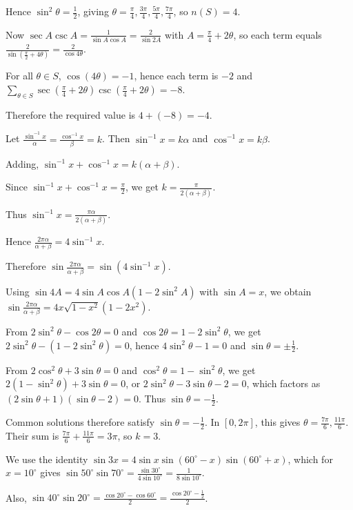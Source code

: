   Hence $\sin^2\theta=\tfrac12$, giving $\theta=\tfrac\pi4,\tfrac{3\pi}4,\tfrac{5\pi}4,\tfrac{7\pi}4$, so
  $n(S)=4$.

  Now $\sec A\csc A=\frac1{\sin A\cos A}=\frac{2}{\sin 2A}$ with $A=\tfrac\pi4+2\theta$, so each term equals
  $\frac{2}{\sin(\tfrac\pi2+4\theta)}=\frac{2}{\cos 4\theta}$.

  For all $\theta\in S$, $\cos(4\theta)=-1$, hence each term is $-2$ and
  $\displaystyle\sum_{\theta\in S}\sec(\tfrac\pi4+2\theta)\csc(\tfrac\pi4+2\theta)=-8$.

  Therefore the required value is $4+(-8)=-4$.
\item Let $\frac{\sin^{-1}x}{\alpha}=\frac{\cos^{-1}x}{\beta}=k$.
  Then $\sin^{-1}x=k\alpha$ and $\cos^{-1}x=k\beta$.

  Adding, $\sin^{-1}x+\cos^{-1}x=k(\alpha+\beta)$.

  Since $\sin^{-1}x+\cos^{-1}x=\frac{\pi}{2}$, we get $k=\frac{\pi}{2(\alpha+\beta)}$.

  Thus $\sin^{-1}x=\frac{\pi\alpha}{2(\alpha+\beta)}$.

  Hence $\frac{2\pi\alpha}{\alpha+\beta}=4\sin^{-1}x$.

  Therefore $\sin\frac{2\pi\alpha}{\alpha+\beta}=\sin(4\sin^{-1}x)$.

  Using $\sin4A=4\sin A\cos A(1-2\sin^2A)$ with $\sin A=x$, we obtain
  $\sin\frac{2\pi\alpha}{\alpha+\beta}=4x\sqrt{1-x^2}(1-2x^2)$.
\item From $2\sin^{2}\theta-\cos2\theta=0$ and $\cos2\theta=1-2\sin^{2}\theta$, we get
  $2\sin^{2}\theta-(1-2\sin^{2}\theta)=0$, hence $4\sin^{2}\theta-1=0$ and $\sin\theta=\pm\frac12$.

  From $2\cos^{2}\theta+3\sin\theta=0$ and $\cos^{2}\theta=1-\sin^{2}\theta$, we get
  $2(1-\sin^{2}\theta)+3\sin\theta=0$, or $2\sin^{2}\theta-3\sin\theta-2=0$, which factors as
  $(2\sin\theta+1)(\sin\theta-2)=0$. Thus $\sin\theta=-\frac12$.

  Common solutions therefore satisfy $\sin\theta=-\frac12$. In $[0,2\pi]$, this gives
  $\theta=\frac{7\pi}{6},\frac{11\pi}{6}$. Their sum is $\frac{7\pi}{6}+\frac{11\pi}{6}=3\pi$, so $k=3$.
\item We use the identity $\sin3x=4\sin x\sin(60^\circ-x)\sin(60^\circ+x)$, which for $x=10^\circ$ gives
  $\sin50^\circ\sin70^\circ=\frac{\sin30^\circ}{4\sin10^\circ}=\frac{1}{8\sin10^\circ}$.

  Also, $\sin40^\circ\sin20^\circ=\frac{\cos20^\circ-\cos60^\circ}{2}=\frac{\cos20^\circ-\tfrac12}{2}$.

